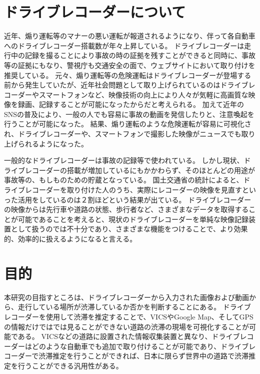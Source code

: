 \newpage

\section{ドライブレコーダーについて}
近年、煽り運転等のマナーの悪い運転が報道されるようになり、伴って各自動車へのドライブレコーダー搭載数が年々上昇している。
ドライブレコーダーは走行中の記録を撮ることにより事故の時の証拠を残すことができると同時に、事故等の証拠にもなり、警視庁も交通安全の面で、ウェブサイトにおいて取り付けを推奨している。
元々、煽り運転等の危険運転はドライブレコーダーが登場する前から発生していたが、近年社会問題として取り上げられているのはドライブレコーダーやスマートフォンなど、映像技術の向上により人々が気軽に高画質な映像を録画、記録することが可能になったからだと考えられる。
加えて近年のSNSの普及により、一般の人でも容易に事故の動画を発信したりと、注意喚起を行うことが可能になった。
結果、煽り運転のような危険運転が容易に可視化され、ドライブレコーダーや、スマートフォンで撮影した映像がニュースでも取り上げられるようになった。

一般的なドライブレコーダーは事故の記録等で使われている。
しかし現状、ドライブレコーダーの搭載が増加しているにもかかわらず、そのほとんどの用途が事故等の、もしものための貯蔵となっている。
国土交通省の統計によると、ドライブレコーダーを取り付けた人のうち、実際にレコーダーの映像を見直すといった活用をしているのは２割ほどという結果が出ている\cite{ministryofland}。
ドライブレコーダーの映像からは先行車や道路の状態、歩行者など、さまざまなデータを取得することが可能であることを考えると、現状のドライブレコーダーを単純な映像記録装置として扱うのでは不十分であり、さまざまな機能をつけることで、より効果的、効率的に扱えるようになると言える。

\section{目的}
本研究の目指すところは、ドライブレコーダーから入力された画像および動画から、走行している場所が渋滞しているか否かを判断することにある。
ドライブレコーダーを使用して渋滞を推定することで、VICSやGoogle Map、そしてGPSの情報だけではでは見ることができない道路の渋滞の現場を可視化することが可能である。
VICSなどの道路に設置された情報収集装置と異なり、ドライブレコーダーはどのような自動車でも追加で取り付けることが可能であり、ドライブレコーダーで渋滞推定を行うことができれば、日本に限らず世界中の道路で渋滞推定を行うことができる汎用性がある。

